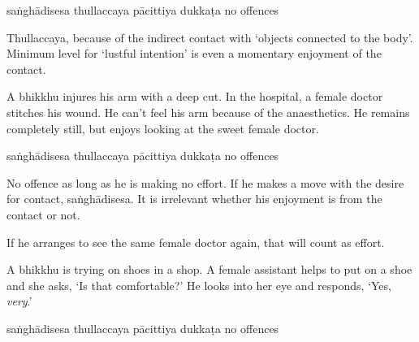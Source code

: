 \begin{exam}{\autoExamName}
\begin{problem*}
\begin{parts}
    \bigskip

    \begin{answers}{5}
      \bChoices
       saṅghādisesa\eAns
       thullaccaya\eAns
       pācittiya\eAns
       dukkaṭa\eAns
       no offences\eAns
      \eChoices
    \end{answers}

    \begin{solution}
      Thullaccaya, because of the indirect contact with `objects connected to the body'.
      Minimum level for `lustful intention' is even a momentary enjoyment of the contact.
    \end{solution}

    \bigskip

  \item A bhikkhu injures his arm with a deep cut. In the hospital, a female
    doctor stitches his wound. He can't feel his arm because of the
    anaesthetics. He remains completely still, but enjoys looking at the sweet female doctor.

    \bigskip

    \begin{answers}{5}
      \bChoices
       saṅghādisesa\eAns
       thullaccaya\eAns
       pācittiya\eAns
       dukkaṭa\eAns
       no offences\eAns
      \eChoices
    \end{answers}

    \begin{solution}
      No offence as long as he is making no effort.
      If he makes a move with the desire for contact, saṅghādisesa.
      It is irrelevant whether his enjoyment is from the contact or not.

      If he arranges to see the same female doctor again, that will count as effort.
    \end{solution}

    \bigskip

  \item A bhikkhu is trying on shoes in a shop. A female assistant helps to put
    on a shoe and she asks, `Is that comfortable?' He looks into her eye and
    responds, `Yes, \textit{very}.'

    \bigskip

    \begin{answers}{5}
      \bChoices
       saṅghādisesa\eAns
       thullaccaya\eAns
       pācittiya\eAns
       dukkaṭa\eAns
       no offences\eAns
      \eChoices
    \end{answers}


\end{parts}
\end{problem*}
\end{exam}
